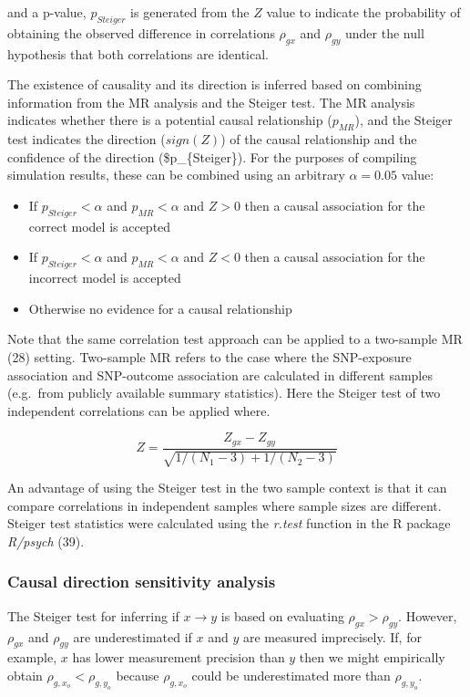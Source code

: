 \documentclass[]{article}
\providecommand{\tightlist}{%
  \setlength{\itemsep}{0pt}\setlength{\parskip}{0pt}}
\begin{document}
and a p-value, \(p_{Steiger}\) is generated from the \(Z\) value to
indicate the probability of obtaining the observed difference in
correlations \(\rho_{gx}\) and \(\rho_{gy}\) under the null hypothesis
that both correlations are identical.

The existence of causality and its direction is inferred based on
combining information from the MR analysis and the Steiger test. The MR
analysis indicates whether there is a potential causal relationship
(\(p_{MR}\)), and the Steiger test indicates the direction (\(sign(Z)\))
of the causal relationship and the confidence of the direction
(\$p\_\{Steiger\}). For the purposes of compiling simulation results,
these can be combined using an arbitrary \(\alpha = 0.05\) value:

\begin{itemize}
\tightlist
\item
  If \(p_{Steiger} < \alpha\) and \(p_{MR} < \alpha\) and \(Z > 0\) then
  a causal association for the correct model is accepted
\item
  If \(p_{Steiger} < \alpha\) and \(p_{MR} < \alpha\) and \(Z < 0\) then
  a causal association for the incorrect model is accepted
\item
  Otherwise no evidence for a causal relationship
\end{itemize}

Note that the same correlation test approach can be applied to a
two-sample MR (28) setting. Two-sample MR refers to the case where the
SNP-exposure association and SNP-outcome association are calculated in
different samples (e.g.~from publicly available summary statistics).
Here the Steiger test of two independent correlations can be applied
where.

\[
Z = \frac{Z_{gx} - Z_{gy}} { \sqrt{ 1 / (N_{1} - 3) + 1 / (N_{2} - 3) } }
\]

An advantage of using the Steiger test in the two sample context is that
it can compare correlations in independent samples where sample sizes
are different. Steiger test statistics were calculated using the
\emph{r.test} function in the R package \emph{R/psych} (39).

\subsubsection{Causal direction sensitivity
analysis}\label{causal-direction-sensitivity-analysis}

The Steiger test for inferring if \(x \rightarrow y\) is based on
evaluating \(\rho_{gx} > \rho_{gy}\). However, \(\rho_{gx}\) and
\(\rho_{gy}\) are underestimated if \(x\) and \(y\) are measured
imprecisely. If, for example, \(x\) has lower measurement precision than
\(y\) then we might empirically obtain \(\rho_{g,x_o} < \rho_{g,y_o}\)
because \(\rho_{g,x_o}\) could be underestimated more than
\(\rho_{g,y_o}\).
\end{document}

